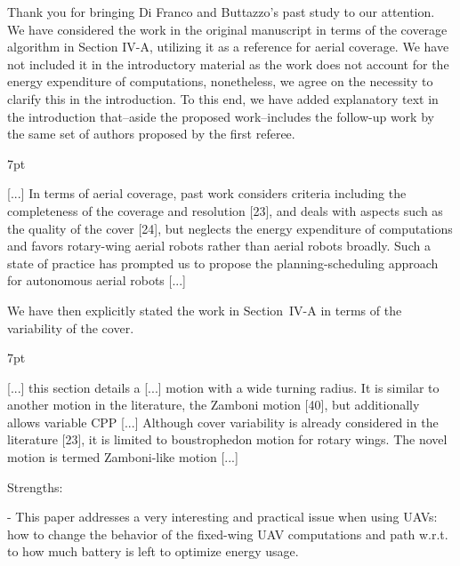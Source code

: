 \documentclass[10pt]{letter}
\newenvironment{formal}{%
  \def\FrameCommand{%
    \hspace{1pt}%
    {\color{red}\vrule width 2pt}%
    {\color{formalshade}\vrule width 4pt}%
    \colorbox{formalshade}%
  }%
  \MakeFramed{\advance\hsize-\width\FrameRestore}%
  \noindent\hspace{-4.55pt}%
  \begin{adjustwidth}{}{7pt}%
  \vspace{2pt}\vspace{2pt}%
}
{%
  \vspace{2pt}\end{adjustwidth}\endMakeFramed%
}
\begin{document}
{\color{blue} 

{\hspace*{-4.5em}{[R2:1]}\vspace*{-1.9em}}

Thank you for bringing Di Franco and Buttazzo's past study to our attention. We have considered the work in the original manuscript in terms of the coverage algorithm in Section IV-A, utilizing it as a reference for aerial coverage. We have not included it in the introductory material as the work does not account for the energy expenditure of computations, nonetheless, we agree on the necessity to clarify this in the introduction. To this end, we have added explanatory text in the introduction that--aside the proposed work--includes the follow-up work by the same set of authors proposed by the first referee.

\begin{formal}
  \color{black} [...] {\color{blue}In terms of aerial coverage, past work considers criteria including the completeness of the coverage and resolution [{\color{green}23}], and deals with aspects such as the quality of the cover [{\color{green}24}], but neglects the energy expenditure of computations and favors rotary-wing aerial robots rather than aerial robots broadly.} Such a state of practice has prompted us to propose the planning-scheduling approach for autonomous aerial robots [...]
  \vspace*{1ex}
\end{formal}

We have then explicitly stated the work in Section~IV-A
in terms of the variability of the cover.

\begin{formal}
  \color{black} [...] this section details a [...] motion with a wide turning radius. It is similar to another motion in the literature, the Zamboni
  motion [{\color{green}40}], but additionally allows variable CPP [...] {\color{blue} Although cover variability is already considered in the literature [{\color{green}23}], it is limited to boustrophedon motion for rotary wings.} The novel motion is termed Zamboni-like motion [...]
  \vspace*{1ex}
\end{formal}

}

\vspace{2em}

Strengths:

- This paper addresses a very interesting and practical issue when using UAVs: how to change the behavior of the fixed-wing UAV computations and path w.r.t. to how much battery is left to optimize energy usage.
\end{document}
